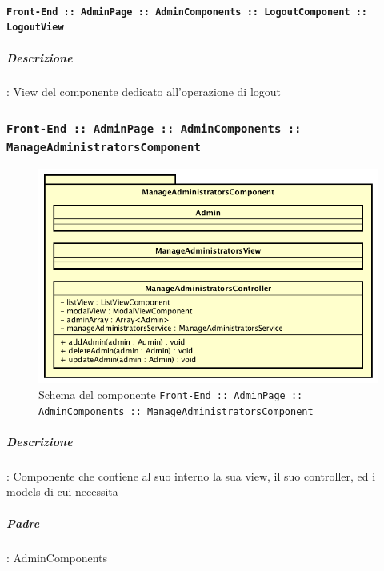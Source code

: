 \documentclass[../DefinizioneDiProdotto_v2.0.0.tex]{subfiles}
\begin{document}
			\paragraph{\texttt{Front-End :: AdminPage :: AdminComponents :: LogoutComponent :: LogoutView}}
				\subparagraph{Descrizione}: View del componente dedicato all'operazione di logout

	\newpage
	\subsubsection{\texttt{Front-End :: AdminPage :: AdminComponents :: ManageAdministratorsComponent}}
	\begin{figure}[!h]
		\centering
		\includegraphics[scale=0.6]{Architettura/Front-End/AdminPage/AdminComponents/ManageAdministratorsComponent.png}
		\caption{Schema del componente \texttt{Front-End :: AdminPage :: AdminComponents :: ManageAdministratorsComponent}}
	\end{figure}

			\subparagraph{Descrizione}: Componente che contiene al suo interno la sua view, il suo controller, ed i models di cui necessita
			\subparagraph{Padre}: AdminComponents
\end{document}
